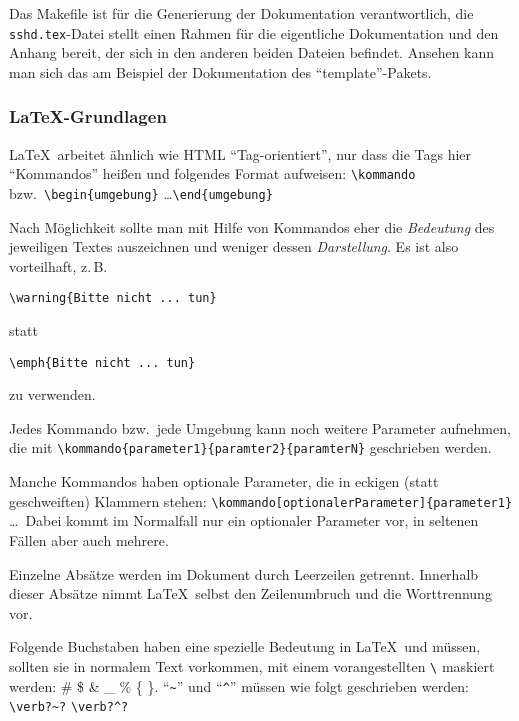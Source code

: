 Das Makefile ist für die Generierung der Dokumentation verantwortlich,
die \texttt{sshd.tex}-Datei stellt einen Rahmen für die eigentliche
Dokumentation und den Anhang bereit, der sich in den anderen beiden Dateien
befindet. Ansehen kann man sich das am Beispiel der
Dokumentation des "`template"'-Pakets.


\subsubsection{\LaTeX-Grundlagen}

\LaTeX\ arbeitet ähnlich wie HTML "`Tag-orientiert"', nur dass die Tags
hier "`Kommandos"' heißen und folgendes Format aufweisen: \verb*?\kommando?
bzw.\ \verb*?\begin{umgebung}? \ldots \verb*?\end{umgebung}?

Nach Möglichkeit sollte man mit Hilfe von Kommandos eher die \emph{Bedeutung}
des jeweiligen Textes auszeichnen und weniger dessen \emph{Darstellung}. Es
ist also vorteilhaft, z.\,B.

\begin{example}
\verb*?\warning{Bitte nicht ... tun}?
\end{example}

\noindent statt

\begin{example}
\verb*?\emph{Bitte nicht ... tun}?
\end{example}

\noindent zu verwenden.

Jedes Kommando bzw.\ jede Umgebung kann noch weitere Parameter
aufnehmen, die mit \verb*?\kommando{parameter1}{paramter2}{paramterN}?
geschrieben werden.

Manche Kommandos haben optionale Parameter, die in eckigen (statt geschweiften)
Klammern stehen: \verb*?\kommando[optionalerParameter]{parameter1}?
\ldots\ Dabei kommt im Normalfall nur ein optionaler Parameter vor, in
seltenen Fällen aber auch mehrere.

Einzelne Absätze werden im Dokument durch Leerzeilen
getrennt.  Innerhalb dieser Absätze nimmt \LaTeX\ selbst den
Zeilenumbruch und die Worttrennung vor.

Folgende Buchstaben haben eine spezielle Bedeutung in \LaTeX\ und müssen,
sollten sie in normalem Text vorkommen, mit einem vorangestellten \verb*?\?
maskiert werden: \# \$ \& \_ \% \{ \}. "`\verb?~?"' und "`\verb?^?"' müssen
wie folgt geschrieben werden: \verb!\verb?~?! \verb!\verb?^?!

